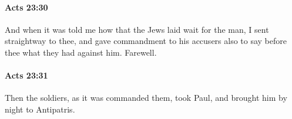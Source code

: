 		\paragraph{Acts 23:30} %
			\label{ACTS-23-30}

			And when it was told me how that the Jews laid wait for the man, I sent straightway to thee, and gave commandment to his accusers also to say before thee what they had against him.  Farewell.

			\begin{framed}
			\scriptsize
				\begin{compactdesc}
					\item[SBLG] 
				\end{compactdesc}
			\end{framed}

		\paragraph{Acts 23:31} %
			\label{ACTS-23-31}

			Then the soldiers, as it was commanded them, took Paul, and brought him by night to Antipatris.

